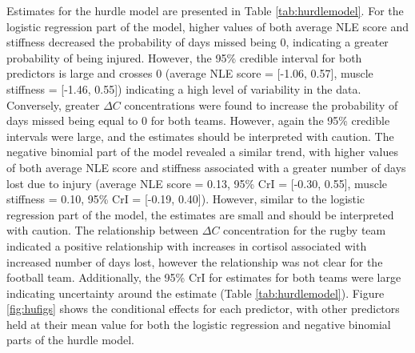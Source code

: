 \documentclass[
  english,
  man,floatsintext]{apa6}
\begin{document}
Estimates for the hurdle model are presented in Table \ref{tab:hurdlemodel}.
For the logistic regression part of the model, higher values of both average NLE score and stiffness decreased the probability of days missed being 0, indicating a greater probability of being injured. However, the 95\% credible interval for both predictors is large and crosses 0 (average NLE score = {[}-1.06, 0.57{]}, muscle stiffness = {[}-1.46, 0.55{]}) indicating a high level of variability in the data.
Conversely, greater \(\Delta C\) concentrations were found to increase the probability of days missed being equal to 0 for both teams.
However, again the 95\% credible intervals were large, and the estimates should be interpreted with caution.
The negative binomial part of the model revealed a similar trend, with higher values of both average NLE score and stiffness associated with a greater number of days lost due to injury (average NLE score = 0.13, 95\% CrI = {[}-0.30, 0.55{]}, muscle stiffness = 0.10, 95\% CrI = {[}-0.19, 0.40{]}).
However, similar to the logistic regression part of the model, the estimates are small and should be interpreted with caution.
The relationship between \(\Delta C\) concentration for the rugby team indicated a positive relationship with increases in cortisol associated with increased number of days lost, however the relationship was not clear for the football team.
Additionally, the 95\% CrI for estimates for both teams were large indicating uncertainty around the estimate (Table \ref{tab:hurdlemodel}).
Figure \ref{fig:hufigs} shows the conditional effects for each predictor, with other predictors held at their mean value for both the logistic regression and negative binomial parts of the hurdle model.
\end{document}
